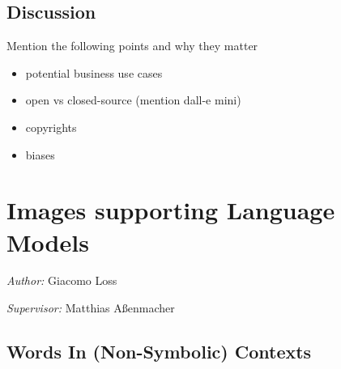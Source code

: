 \documentclass[
]{krantz}
\providecommand{\tightlist}{%
  \setlength{\itemsep}{0pt}\setlength{\parskip}{0pt}}
\begin{document}
\hypertarget{discussion-1}{%
\subsection{Discussion}\label{discussion-1}}

Mention the following points and why they matter

\begin{itemize}
\tightlist
\item
  potential business use cases
\item
  open vs closed-source (mention dall-e mini)
\item
  copyrights
\item
  biases
\end{itemize}

\hypertarget{c02-03-img-support-text}{%
\section{Images supporting Language Models}\label{c02-03-img-support-text}}

\emph{Author:} Giacomo Loss

\emph{Supervisor:} Matthias Aßenmacher

\hypertarget{words-in-non-symbolic-contexts}{%
\subsection{Words In (Non-Symbolic) Contexts}\label{words-in-non-symbolic-contexts}}
\end{document}
